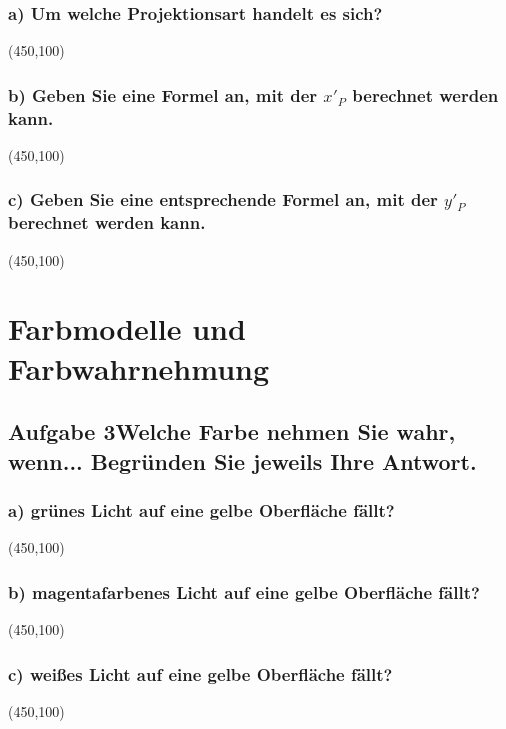 \documentclass[10pt, a4paper]{article}
\begin{document}
\subsubsection{a) Um welche Projektionsart handelt es sich?}
\begin{center}
    \framebox(450,100){}
\end{center}
\subsubsection{b) Geben Sie eine Formel an, mit der $x'_P$ berechnet werden kann.}
\begin{center}
    \framebox(450,100){}
\end{center}
\subsubsection{c) Geben Sie eine entsprechende Formel an, mit der $y'_P$ berechnet werden kann.}
\begin{center}
    \framebox(450,100){}
\end{center}


\section{Farbmodelle und Farbwahrnehmung}
\subsection{Aufgabe 3\newline Welche Farbe nehmen Sie wahr, wenn... \newline Begründen Sie jeweils Ihre Antwort.}
\subsubsection{a) grünes Licht auf eine gelbe Oberfläche fällt?}
\begin{center}
    \framebox(450,100){}
\end{center}
\subsubsection{b) magentafarbenes Licht auf eine gelbe Oberfläche fällt?}
\begin{center}
    \framebox(450,100){}
\end{center}
\subsubsection{c) weißes Licht auf eine gelbe Oberfläche fällt?}
\begin{center}
    \framebox(450,100){}
\end{center}
\end{document}
